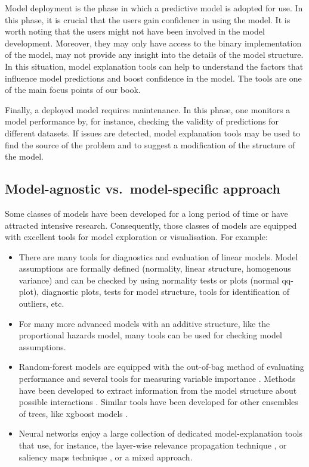 \documentclass[12pt,]{krantz}
\providecommand{\tightlist}{%
  \setlength{\itemsep}{0pt}\setlength{\parskip}{0pt}}
\begin{document}
Model deployment is the phase in which a predictive model is adopted for use. In this phase, it is crucial that the users gain confidence in using the model. It is worth noting that the users might not have been involved in the model development. Moreover, they may only have access to the binary implementation of the model, may not provide any insight into the details of the model structure. In this situation, model explanation tools can help to understand the factors that influence model predictions and boost confidence in the model. The tools are one of the main focus points of our book.

Finally, a deployed model requires maintenance. In this phase, one monitors a model performance by, for instance, checking the validity of predictions for different datasets. If issues are detected, model explanation tools may be used to find the source of the problem and to suggest a modification of the structure of the model.

\hypertarget{model-agnostic-vs.model-specific-approach}{%
\subsection{Model-agnostic vs.~model-specific approach}\label{model-agnostic-vs.model-specific-approach}}

Some classes of models have been developed for a long period of time or have attracted intensive research. Consequently, those classes of models are equipped with excellent tools for model exploration or visualisation. For example:

\begin{itemize}
\tightlist
\item
  There are many tools for diagnostics and evaluation of linear models. Model assumptions are formally defined (normality, linear structure, homogenous variance) and can be checked by using normality tests or plots (normal qq-plot), diagnostic plots, tests for model structure, tools for identification of outliers, etc.
\item
  For many more advanced models with an additive structure, like the proportional hazards model, many tools can be used for checking model assumptions.
\item
  Random-forest models are equipped with the out-of-bag method of evaluating performance and several tools for measuring variable importance \citep{R-randomForest}. Methods have been developed to extract information from the model structure about possible interactions \citep{randomForestExplainer}. Similar tools have been developed for other ensembles of trees, like xgboost models \citep{xgboostExplainer}.
\item
  Neural networks enjoy a large collection of dedicated model-explanation tools that use, for instance, the layer-wise relevance propagation technique \citep{BachLWRP}, or saliency maps technique \citep{SaliencyMaps}, or a mixed approach.
\end{itemize}
\end{document}
